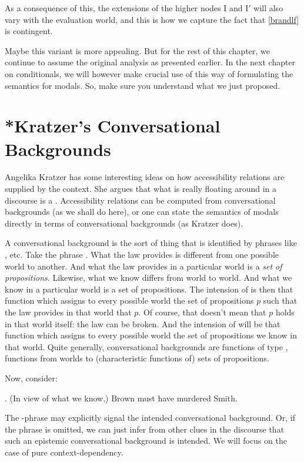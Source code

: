 As a consequence of this, the extensions of the higher nodes I and I$'$ will also vary with the evaluation world, and this is how we capture the fact that \ref{brandlf} is contingent.

Maybe this variant is more appealing. But for the rest of this chapter, we continue to assume the original analysis as presented earlier. In the next chapter on conditionals, we will however make crucial use of this way of formulating the semantics for modals. So, make sure you understand what we just proposed.

\section{*Kratzer's Conversational Backgrounds} \label{sec:kratz-conv-backgr}

Angelika Kratzer has some interesting ideas on how accessibility relations are supplied by the context. She argues that what is really floating around in a discourse is a . Accessibility relations can be computed from conversational backgrounds (as we shall do here), or one can state the semantics of modals directly in terms of conversational backgrounds (as Kratzer does).

A conversational background is the sort of thing that is identified by phrases like , etc. Take the phrase . What the law provides is different from one possible world to another. And what the law provides in a particular world is a \emph{set of propositions}. Likewise, what we know differs from world to world. And what we know in a particular world is a set of propositions. The intension of  is then that function which assigns to every possible world the set of propositions $p$ such that the law provides in that world that $p$. Of course, that doesn't mean that $p$ holds in that world itself: the law can be broken. And the intension of  will be that function which assigns to every possible world the set of propositions we know in that world. Quite generally, conversational backgrounds are functions of type , functions from worlds to (characteristic functions of) sets of propositions.

Now, consider:

\ex. (In view of what we know,) Brown must have murdered Smith.

The -phrase may explicitly signal the intended conversational background. Or, if the phrase is omitted, we can just infer from other clues in the discourse that such an epistemic conversational background is intended. We will focus on the case of pure context-dependency.

